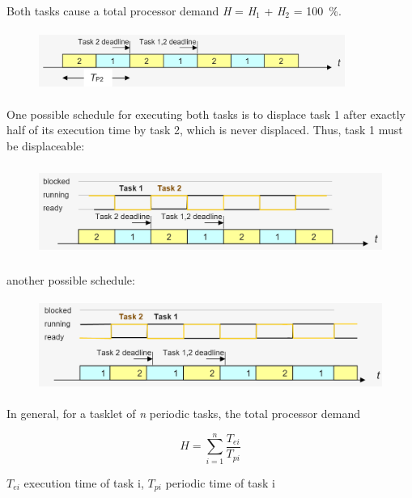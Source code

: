Both tasks cause a total processor demand \textit{H} = \textit{H}${}_{1}$ + \textit{H}${}_{2}$ = 100~\%.

	\begin{figure}[h]
    \centering
    \includegraphics[width=10cm, height=2cm]{Images/image85.png}
    \label{fig:Fig }
    \end{figure} 
\newpage
One possible schedule for executing both tasks is to displace task 1 after exactly half of its execution time by task 2, which is never displaced. Thus, task 1 must be displaceable:

	\begin{figure}[h]
    \centering
    \includegraphics[width=14cm, height=3cm]{Images/image86.png}
    \label{fig:Fig }
    \end{figure} 

another possible schedule:

	\begin{figure}[h]
    \centering
    \includegraphics[width=14cm, height=3cm]{Images/image87.png}
    \label{fig:Fig }
    \end{figure}

In general, for a tasklet of \textit{n} periodic tasks, the total processor demand

\begin{equation}
	H=\sum _{i=1}^{n}\frac{T_{ei} }{T_{pi}}
\label{EQ 3}
\end{equation}

$T_{ei}$ execution time of task i, $T_{pi}$ periodic time of task i

\newpage

